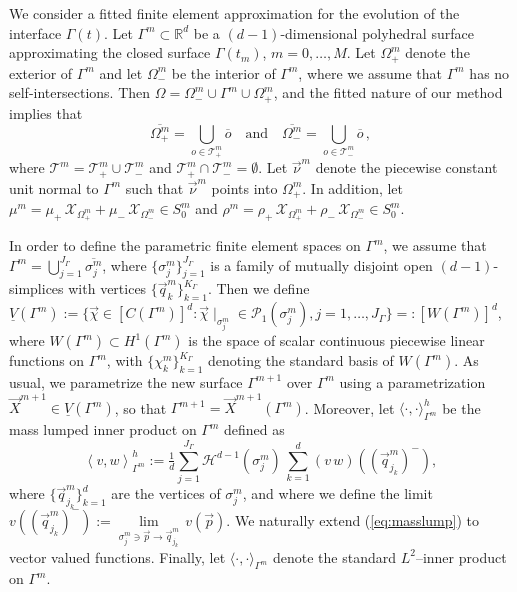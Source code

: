 \documentclass[a4paper,12pt,onecolumn]{article}
\newcommand{\R}{\mathbb R}
\newcommand{\surfvol}{\mathcal{H}^{d-1}}
\newcommand{\bigchi}{\ensuremath{\mathrm{\mathcal{X}}}}
\newcommand{\charfcn}[1]{\bigchi_{#1}} %
\newcommand{\Vh}{\underline{V}(\Gamma^m)}
\newcommand{\Wh}{W(\Gamma^m)}
\begin{document}
We consider a fitted finite element approximation for the evolution of the
interface $\Gamma(t)$. Let $\Gamma^m\subset\R^d$ be a $(d-1)$-dimensional
polyhedral surface approximating the closed surface $\Gamma(t_m)$, $m=0
,\ldots, M$. Let $\Omega^m_+$ denote the exterior of $\Gamma^m$ and let
$\Omega^m_-$ be the interior of $\Gamma^m$, where we assume that $\Gamma^m$ has
no self-intersections. Then $\Omega = \Omega_-^m \cup \Gamma^m \cup
\Omega_+^m$, and the fitted nature of
our method implies that
\begin{equation*}
\overline{\Omega^m_+} = \bigcup_{o \in \mathcal{T}^m_+} \overline{o}
\quad\text{and}\quad
\overline{\Omega^m_-} = \bigcup_{o \in \mathcal{T}^m_-} \overline{o} \,,
\end{equation*}
where $\mathcal{T}^m = \mathcal{T}^m_+ \cup \mathcal{T}^m_-$ and
$\mathcal{T}^m_+ \cap \mathcal{T}^m_- = \emptyset$. Let $\vec \nu^m$ denote the
piecewise constant unit normal to $\Gamma^m$ such that $\vec\nu^m$ points into
$\Omega^m_+$.
In addition, let
$\mu^m = \mu_+\,\charfcn{\Omega^m_+} + \mu_-\,\charfcn{\Omega^m_-}\in S^m_0$
and
$\rho^m = \rho_+\,\charfcn{\Omega^m_+} + \rho_-\,\charfcn{\Omega^m_-}
\in S^m_0$.

In order to define the parametric finite element spaces on $\Gamma^m$, we
assume that $\Gamma^m=\bigcup_{j=1}^{J_\Gamma} \overline{\sigma^m_j}$, where
$\{\sigma^m_j\}_{j=1}^{J_\Gamma}$ is a family of mutually disjoint open
$(d-1)$-simplices with vertices $\{\vec q^m_k\}_{k=1}^{K_\Gamma}$. Then
we define $\Vh := \{\vec\chi \in [C(\Gamma^m)]^d:\vec\chi\!\mid_{\sigma^m_j}
\in \mathcal{P}_1(\sigma^m_j), j=1,\ldots, J_\Gamma\} =: [\Wh]^d$, where $\Wh
\subset H^1(\Gamma^m)$ is the space of scalar continuous piecewise linear
functions on $\Gamma^m$, with $\{\chi^m_k\}_{k=1}^{K_\Gamma}$ denoting the
standard basis of $\Wh$. As usual, we parametrize the new surface
$\Gamma^{m+1}$ over $\Gamma^m$ using a parametrization $\vec X^{m+1} \in \Vh$,
so that $\Gamma^{m+1} = \vec X^{m+1}(\Gamma^m)$. Moreover, let
$\langle\cdot,\cdot\rangle_{\Gamma^m}^h$ be the mass lumped inner product on
$\Gamma^m$ defined as
\begin{equation} \label{eq:masslump}
\left\langle v, w \right\rangle^h_{\Gamma^m} :=
\tfrac1d \sum_{j=1}^{J_\Gamma} \surfvol(\sigma^m_j)\,
\sum_{k=1}^d (v\,w)((\vec q^m_{j_k})^-),
\end{equation}
where $\{\vec q^m_{j_k}\}_{k=1}^d$ are the vertices of $\sigma^m_j$, and
where we define the limit $v((\vec q^m_{j_k})^-)
:= \underset{\sigma^m_j\ni \vec p\to \vec q^m_{j_k}}{\lim}\, v(\vec p)$. We
naturally extend (\ref{eq:masslump}) to vector valued functions. Finally, let
$\langle\cdot,\cdot\rangle_{\Gamma^m}$ denote the standard $L^2$--inner product
on $\Gamma^m$.
\end{document}

